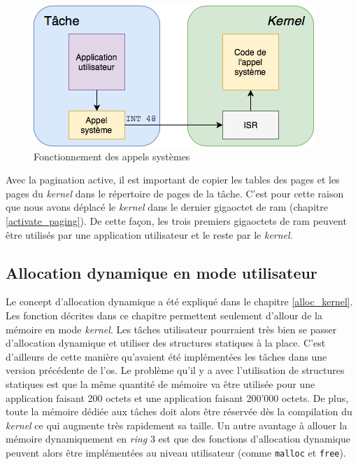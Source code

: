 \begin{figure}[!h]
  \centering
  \includegraphics[scale=.75]{images/syscall.png}
  \caption{Fonctionnement des appels systèmes}
  \label{syscall}
\end{figure}

Avec la pagination active, il est important de copier les tables des pages et les
pages du \textit{kernel} dans le répertoire de pages de la tâche. C'est pour cette
raison que nous avons déplacé le \textit{kernel} dans le dernier gigaoctet de
\acrshort{ram} (chapitre \ref{activate_paging}). De cette façon, les trois premiers
gigaoctets de \acrshort{ram} peuvent être utilisés par une application utilisateur
et le reste par le \textit{kernel}.


\subsection{Allocation dynamique en mode utilisateur}
\label{alloc_user}
Le concept d'allocation dynamique a été expliqué dans le chapitre \ref{alloc_kernel}.
Les fonction décrites dans ce chapitre permettent seulement d'allour de la mémoire
en mode \textit{kernel}. Les tâches utilisateur pourraient très bien se passer
d'allocation dynamique et utiliser des structures statiques à la place. C'est
d'ailleurs de cette manière qu'avaient été implémentées les tâches dans une version
précédente de l'\acrshort{os}. Le problème qu'il y a avec l'utilisation de structures
statiques est que la même quantité de mémoire va être utilisée pour une application
faisant 200 octets et une application faisant 200'000 octets. De plus, toute la
mémoire dédiée aux tâches doit alors être réservée dès la compilation du \textit{kernel}
ce qui augmente très rapidement sa taille. Un autre avantage à allouer la mémoire
dynamiquement en \textit{ring} 3 est que des fonctions d'allocation dynamique 
peuvent alors être implémentées au niveau utilisateur (comme \texttt{malloc}
et \texttt{free}). \\

